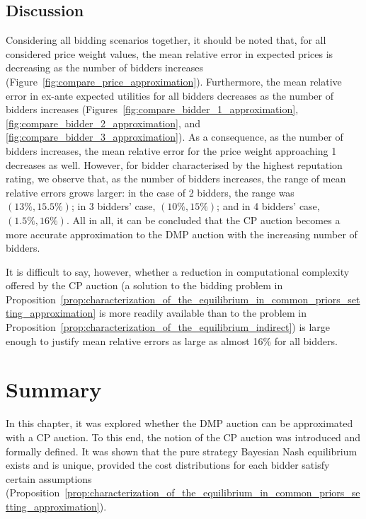 \subsection{Discussion} %
\label{sub:discussion_approximation}
Considering all bidding scenarios together, it should be noted that, for all considered price weight values, the mean relative error in expected prices is decreasing as the number of bidders increases (Figure~\ref{fig:compare_price_approximation}). Furthermore, the mean relative error in ex-ante expected utilities for all bidders decreases as the number of bidders increases (Figures~\ref{fig:compare_bidder_1_approximation}, \ref{fig:compare_bidder_2_approximation}, and \ref{fig:compare_bidder_3_approximation}). As a consequence, as the number of bidders increases, the mean relative error for the price weight approaching 1 decreases as well. However, for bidder characterised by the highest reputation rating, we observe that, as the number of bidders increases, the range of mean relative errors grows larger: in the case of 2 bidders, the range was $(13\%, 15.5\%)$; in 3 bidders' case, $(10\%, 15\%)$; and in 4 bidders' case, $(1.5\%, 16\%)$. All in all, it can be concluded that the CP auction becomes a more accurate approximation to the DMP auction with the increasing number of bidders.

It is difficult to say, however, whether a reduction in computational complexity offered by the CP auction (a solution to the bidding problem in Proposition~\ref{prop:characterization_of_the_equilibrium_in_common_priors_setting_approximation} is more readily available than to the problem in Proposition~\ref{prop:characterization_of_the_equilibrium_indirect}) is large enough to justify mean relative errors as large as almost 16\% for all bidders.

\section{Summary} %
\label{sec:summary_approximation}
In this chapter, it was explored whether the DMP auction can be approximated with a CP auction. To this end, the notion of the CP auction was introduced and formally defined. It was shown that the pure strategy Bayesian Nash equilibrium exists and is unique, provided the cost distributions for each bidder satisfy certain assumptions (Proposition~\ref{prop:characterization_of_the_equilibrium_in_common_priors_setting_approximation}).

